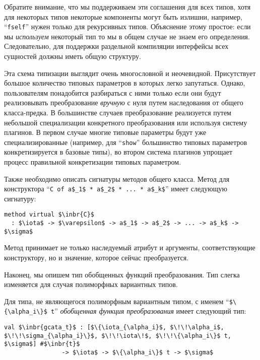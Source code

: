 Обратите внимание, что мы поддерживаем эти соглашения для всех типов, хотя для некоторых типов некоторые компоненты могут быть излишни, например, ``\lstinline{fself}''
нужен только для рекурсивных типов. Объяснение этому простое: если мы \emph{используем} некоторый тип
то мы в общем случае не знаем его определения. Следовательно, для поддержки раздельной компиляции интерфейсы всех сущностей должны иметь общую структуру.

Эта схема типизации выглядит очень многословной и неочевидной. Присутствует большое количество типовых параметров в которых легко запутаться.
Однако, пользователям понадобится разбираться с ними только если они будут реализовывать преобразование \emph{вручную} с нуля путем 
наследования от общего класса-предка.
В большинстве случаев преобразование реализуется путем небольшой специализации конкретного преобразования или используя систему плагинов. 
В первом случае многие типовые параметры будут уже специализированные (например, для  ``\lstinline{show}'' большинство типовых параметров конкретизируется в базовые типы), во втором система плагинов упрощает процесс правильной конкретизации типовых параметром. %

Также необходимо описать сигнатуры методов общего класса. Метод для конструктора  ``\lstinline|C of a$_1$ * a$_2$ * ... * a$_k$|'' имеет следующую сигнатуру:

\begin{lstlisting}
method virtual $\inbr{C}$ 
  : $\iota$ -> $\varepsilon$ -> a$_1$ -> a$_2$ -> ... -> a$_k$ -> $\sigma$
\end{lstlisting}

\noindent Метод принимает не только наследуемый атрибут и аргументы, соответствующие конструктору, но и значение, которое сейчас преобразуется.

Наконец, мы опишем тип обобщенных функций преобразования. Тип слегка изменяется для случая полиморфных вариантных типов.

Для типа, не являющегося полиморфным вариантным типом, с именем ``\lstinline|$\{\alpha_i\}$ t|'' \emph{обобщенная функция преобразования} имеет следующий тип:

\begin{lstlisting}
val $\inbr{gcata_t}$ : [$\{\iota_{\alpha_i}$, $\!\!\alpha_i$, $\!\!\sigma_{\alpha_i}\}$, $\!\!\iota\!$, $\!\!\{\alpha_i\}$ t, $\sigma$] #$\inbr{t}$ 
                -> $\iota$ -> $\{\alpha_i\}$ t -> $\sigma$
\end{lstlisting}

